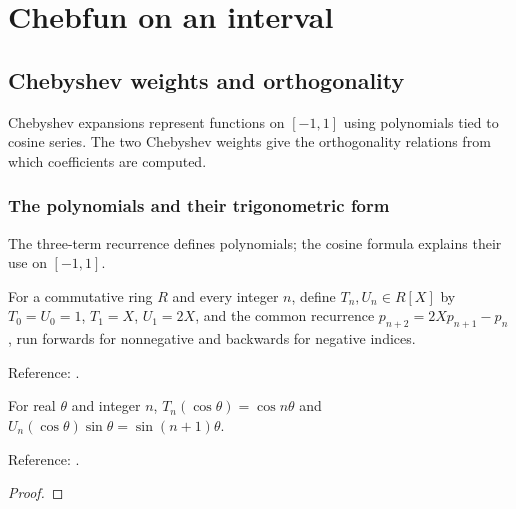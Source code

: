 \part{Chebfun on an interval}\label{part:chebfun}

\chapter{Chebyshev weights and orthogonality}\label{chap:weights}


Chebyshev expansions represent functions on $[-1,1]$ using polynomials tied to cosine series. The two Chebyshev weights give the orthogonality relations from which coefficients are computed.

\section{The polynomials and their trigonometric form}\label{sec:textbook-weights-polynomials}

The three-term recurrence defines polynomials; the cosine formula explains their use on $[-1,1]$.

\begin{definition}
\label{def:chebyshev-mathlib}
\mathlibok
For a commutative ring $R$ and every integer $n$, define $T_n,U_n\in R[X]$ by $T_0=U_0=1$, $T_1=X$, $U_1=2X$, and the common recurrence
$p_{n+2}=2Xp_{n+1}-p_n$, run forwards for nonnegative and backwards for
negative indices.

Reference: \cite[Table 18.9.1]{dlmf}.
\end{definition}

\begin{theorem}
\label{thm:chebyshev-trig}
\mathlibok
For real $\theta$ and integer $n$, $T_n(\cos\theta)=\cos n\theta$ and
$U_n(\cos\theta)\sin\theta=\sin(n+1)\theta$.

Reference: \cite[18.5.1--18.5.2]{dlmf}.
\end{theorem}
\begin{proof}
\mathlibok
\end{proof}

